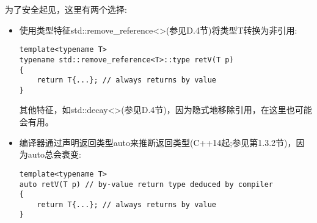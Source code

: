 为了安全起见，这里有两个选择:

\begin{itemize}
\item 
使用类型特征std::remove\_reference<>(参见D.4节)将类型T转换为非引用:

\begin{lstlisting}[style=styleCXX]
template<typename T>
typename std::remove_reference<T>::type retV(T p)
{
	return T{...}; // always returns by value
}
\end{lstlisting}

其他特征，如std::decay<>(参见D.4节)，因为隐式地移除引用，在这里也可能会有用。

\item 
编译器通过声明返回类型auto来推断返回类型(C++14起;参见第1.3.2节)，因为auto总会衰变:

\begin{lstlisting}[style=styleCXX]
template<typename T>
auto retV(T p) // by-value return type deduced by compiler
{
	return T{...}; // always returns by value
}
\end{lstlisting}

\end{itemize}



















